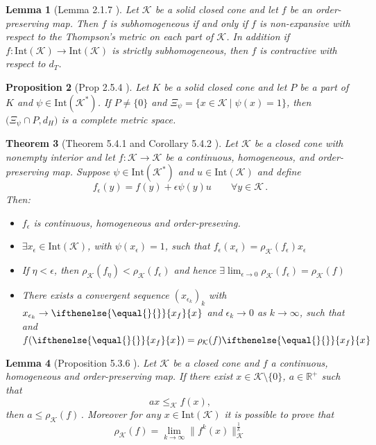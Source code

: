 \documentclass{article}
\newtheorem{theorem}{Theorem}[section]
\newtheorem{lemma}[theorem]{Lemma}
\newtheorem{proposition}[theorem]{Proposition}
\newcommand{\R}{\mathbb{R}}
\newcommand{\cradius}{\rho_{\cone}}
\newcommand{\cone}{\mathcal{K}}
\newcommand{\interior}{\mathrm{Int}}
\newcommand{\dist}{d_H}
\newcommand{\distT}{d_T}
\newcommand{\cleq}{\leq_{\cone}}
\newcommand{\ceigenvector}[1][]{
  \ifthenelse{\equal{#1}{}}
  {{x_f}}
  {{x}_{#1}}}
\begin{document}
\begin{lemma}[Lemma 2.1.7 \cite{lemmens2012nonlinear}]
    Let $\cone$ be a solid closed cone and let $f$ be an order-preserving map. Then $f$ is subhomogeneous if and only if $f$ is non-expansive with respect to the Thompson's metric on each part of $\cone$. In addition if $f:\interior(\cone)\rightarrow \interior(\cone)$ is strictly subhomogeneous, then $f$ is contractive with respect to $\distT$.
\end{lemma}

%
%

\begin{proposition}[Prop 2.5.4 \cite{lemmens2012nonlinear}]
Let $K$ be a solid closed cone and let $P$ be a part of $K$ and $\psi\in \interior(\cone^*)$. If $P\neq \{0\}$ and $\Xi_{\psi}=\{x\in\cone\:|\;\psi(x)=1\}$, then $\big(\Xi_{\psi}\cap P, \dist\big)$ is a complete metric space.
\end{proposition}
%
%


\begin{theorem}[Theorem 5.4.1 and Corollary 5.4.2 \cite{lemmens2012nonlinear}]\label{Thm_existence_of_eigenvector}
Let $\cone$ be a closed cone with nonempty interior and let $f:\cone\rightarrow \cone$ be a continuous, homogeneous, and order-preserving map. Suppose $\psi\in\interior(\cone^*)$ and $u\in\interior(\cone)$ and define
$$
f_{\epsilon}(y)=f(y)+\epsilon\psi(y) u\qquad \forall y\in\cone\,.
$$
Then:
%
\begin{itemize}
\item $f_{\epsilon}$ is continuous, homogeneous and order-preseving.
%
\item $\exists x_{\epsilon}\in\interior(\cone)$, with $\psi(x_{\epsilon})=1$, such that $f_{\epsilon}(x_{\epsilon})=\cradius(f_{\epsilon})x_{\epsilon}$
%
%
\item If $\eta<\epsilon$, then $\cradius(f_{\eta})<\cradius(f_{\epsilon})$ and hence $\exists \lim_{\epsilon\rightarrow 0}\cradius(f_{\epsilon})=\cradius(f)$
%
%
\item There exists a convergent sequence $(x_{\epsilon_k})_k$ with $x_{\epsilon_k}\rightarrow \ceigenvector$ and $\epsilon_k\rightarrow 0$ as $k\rightarrow \infty$, such that and $f(\ceigenvector)=\cradius(f)\ceigenvector$
\end{itemize}
\end{theorem}

\begin{lemma}[Proposition 5.3.6 \cite{lemmens2012nonlinear}]\label{Lemma_lemmens_spectral_radius_2} Let $\cone$ be a closed cone and $f$ a continuous, homogeneous and order-preserving map.
If there exist $x  \in \cone\setminus\{0\}$, $a\in \R^+$ such that 
\begin{equation}
    ax\cleq f(x),
\end{equation}
then $a\leq \cradius(f)$\,.
Moreover for any $x\in\interior(\cone)$ it is possible to prove that 
    \begin{equation}
        \cradius(f)=\lim_{k\rightarrow \infty}\|f^k(x)\|_{\cone}^{\frac{1}{k}}
    \end{equation}
\end{lemma}
\end{document}
